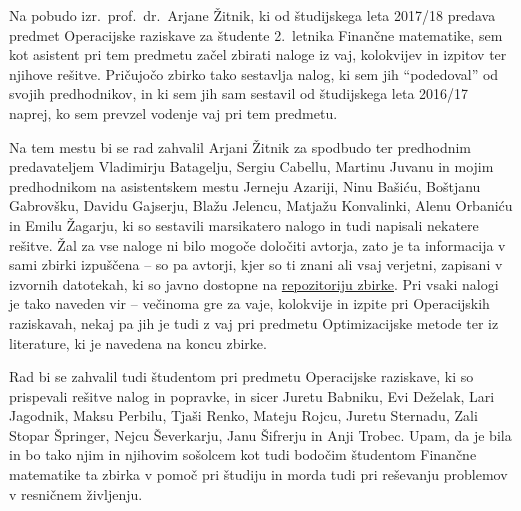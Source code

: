 Na pobudo izr.~prof.~dr.~Arjane Žitnik,
ki od študijskega leta 2017/18 predava predmet Operacijske raziskave
za študente 2.~letnika Finančne matematike,
sem kot asistent pri tem predmetu začel zbirati
naloge iz vaj, kolokvijev in izpitov ter njihove rešitve.
Pričujočo zbirko tako sestavlja \thetotal{} nalog,
ki sem jih ``podedoval'' od svojih predhodnikov,
in ki sem jih sam sestavil od študijskega leta 2016/17 naprej,
ko sem prevzel vodenje vaj pri tem predmetu.

Na tem mestu bi se rad zahvalil Arjani Žitnik za spodbudo
ter predhodnim predavateljem Vladimirju Batagelju, Sergiu Cabellu, Martinu Juvanu
in mojim predhodnikom na asistentskem mestu
Jerneju Azariji, Ninu Bašiću, Boštjanu Gabrovšku, Davidu Gajserju,
Blažu Jelencu, Matjažu Konvalinki, Alenu Orbaniću in Emilu Žagarju,
ki so sestavili marsikatero nalogo in tudi napisali nekatere rešitve.
Žal za vse naloge ni bilo mogoče določiti avtorja,
zato je ta informacija v sami zbirki izpuščena
-- so pa avtorji, kjer so ti znani ali vsaj verjetni,
zapisani v izvornih datotekah,
ki so javno dostopne na
\href{https://github.com/jaanos/or-zbirka}{repozitoriju zbirke}.
Pri vsaki nalogi je tako naveden vir
-- večinoma gre za vaje, kolokvije in izpite pri Operacijskih raziskavah,
nekaj pa jih je tudi z vaj pri predmetu Optimizacijske metode
ter iz literature, ki je navedena na koncu zbirke.

Rad bi se zahvalil tudi študentom pri predmetu Operacijske raziskave,
ki so prispevali rešitve nalog in popravke,
in sicer Juretu Babniku, Evi Deželak, Lari Jagodnik, Maksu Perbilu, Tjaši Renko,
Mateju Rojcu, Juretu Sternadu, Zali Stopar Špringer, Nejcu Ševerkarju,
Janu Šifrerju in Anji Trobec.
Upam,
da je bila in bo tako njim in njihovim sošolcem
kot tudi bodočim študentom Finančne matematike
ta zbirka v pomoč pri študiju
in morda tudi pri reševanju problemov v resničnem življenju.
